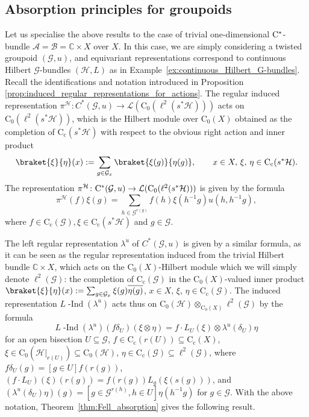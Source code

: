 \documentclass[11 pt, leqno]{amsart}
\numberwithin{equation}{section}
\theoremstyle{plain}
\theoremstyle{definition}
\newcommand*{\cstar}{\texorpdfstring{\(\Cst\)\nobreakdash-\hspace{0pt}}{*-}}
\newcommand*{\Cst}{\mathrm \cst}%
\newcommand*{\contc}{\mathrm{C_c}}%
\newcommand*{\contz}{\mathrm{C_0}}%
\DeclareMathOperator{\dashind}{-Ind}
\renewcommand{\H}{\mathcal H}
\newcommand{\B}{\mathcal B}
\newcommand{\LL}{\mathcal L}
\newcommand{\G}{\mathcal G} %
\newcommand{\EE}{\mathcal E}
\newcommand{\A}{\mathcal A}
\newcommand{\C}{\mathbb C}
\newcommand{\cst}{\ifmmode\mathrm{C}^*\else{$\mathrm{C}^*$}\fi}
\begin{document}
%
\subsection{Absorption principles for groupoids} %

Let us specialise the above results to the case of trivial one-dimensional \cstar{}bundle $\A=\B=\C\times X$ over $X$. 
In this case, we are simply considering a  twisted groupoid $(\G,u)$, and equivariant representations correspond to continuous Hilbert $\G$-bundles $(\H,L)$ as in Example~\ref{ex:continuous_Hilbert_G-bundles}. 
Recall the identifications and notation introduced in Proposition \ref{prop:induced_regular_representations_for_actions}. 
The regular induced representation $\pi^\H\colon C^*(\G,u)\to \LL(\contz(\ell^2(s^*\H)))$  acts on $\contz(\ell^2(s^*\H))$, which is the Hilbert module over $\contz(X)$ obtained as the completion of $\contc(s^*\H)$ with respect to the obvious right action and inner product
\[
    \braket{\xi}{\eta}(x):=\sum_{g\in \G_x}\braket{\xi(g)}{\eta(g)},\qquad x\in X,\, \xi,\, \eta \in \contc(s^*\H).
\]
The representation $\pi^\H\colon\Cst(\G,u)\to \LL(\contz(\ell^2(s^*\H)))$ is given by the formula
\[
    \pi^\H(f)\xi(g)=\sum_{h\in \G^{r(g)}}f(h)\xi(h^{-1}g)u(h,h^{-1}g),
\]
where $ f \in \contc(\G), \xi \in \contc(s^*\H)$ and $g \in \G$.

The left regular representation $\lambda^u$ of $C^*(\G,u)$ is given by a similar formula, as it can be seen as the regular representation induced from the trivial Hilbert bundle $\C\times X$, which acts on the $\contz(X)$-Hilbert module which we will simply denote $\ell^2(\G)$: the completion of $\contc(\G)$ in the $\contz(X)$-valued inner product $\braket{\xi}{\eta}(x):=\sum_{g\in \G_x} \xi(g)\overline{\eta(g)}$, $x\in X,\, \xi,\, \eta \in \contc(\G)$. %
The induced representation $L\dashind(\lambda^u)$ acts thus on $\contz(\H)\otimes_{\contz(X)}\ell^2(\G)$ by the formula
\[
    L\dashind(\lambda^u)(f\delta_U)(\xi\otimes\eta)= f\cdot L_U(\xi)\otimes \lambda^u(\delta_U)\eta
\]
for an open bisection $U\subseteq \G$, $f\in \contc(r(U))\subseteq \contc(X)$, $\xi\in \contz(\H|_{r(U)})\subseteq \contz(\H)$, $\eta \in \contc(\G)\subseteq \ell^2(\G)$,
where $f\delta_U(g)=[g\in U]f(r(g))$, $(f\cdot L_U)(\xi)(r(g))=f(r(g))L_g(\xi(s(g)))$, and $(\lambda^u(\delta_U)\eta)(g)=[g \in \G^{r(h)}, h \in U]\eta(h^{-1}g)$ for $g \in \G$.
With the above notation, Theorem~\ref{thm:Fell_absorption} gives the following result. 
\end{document}
